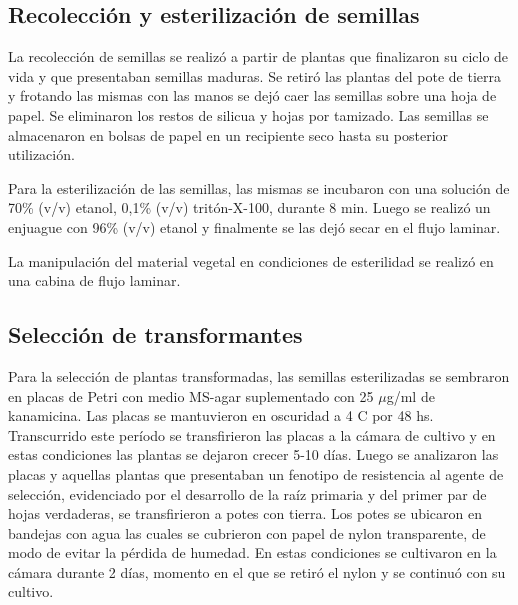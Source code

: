 \subsection{Recolección y esterilización de semillas}

La recolección de semillas se realizó a partir de plantas que finalizaron su ciclo de vida y que presentaban semillas maduras.
Se retiró las plantas del pote de tierra y frotando las mismas con las manos se dejó caer las semillas sobre una hoja de papel.
Se eliminaron los restos de silicua y hojas por tamizado. Las semillas se almacenaron en bolsas de papel en un recipiente seco hasta su posterior utilización.

Para la esterilización de las semillas, las mismas se incubaron con una solución de 70\% (v/v) etanol, 0,1\% (v/v) tritón-X-100, durante 8 min. 
Luego se realizó un enjuague con 96\% (v/v) etanol y finalmente se las dejó secar en el flujo laminar.

La manipulación del material vegetal en condiciones de esterilidad se realizó en una cabina de flujo laminar.

\subsection{Selección de transformantes}
Para la selección de plantas transformadas, las semillas esterilizadas se sembraron en placas de Petri con medio MS-agar suplementado con 25 $\mu$g/ml de kanamicina.
Las placas se mantuvieron en oscuridad a 4 \degree C por 48 hs. Transcurrido este período se transfirieron las placas a la cámara de cultivo y en estas condiciones las plantas se dejaron crecer 5-10 días.
Luego se analizaron las placas y aquellas plantas que presentaban un fenotipo de resistencia al agente de selección, evidenciado por el desarrollo de la raíz primaria y del primer par de hojas verdaderas, se transfirieron a potes con tierra.
Los potes se ubicaron en bandejas con agua las cuales se cubrieron con papel de nylon transparente, de modo de evitar la pérdida de humedad.
En estas condiciones se cultivaron en la cámara durante 2 días, momento en el que se retiró el nylon y se continuó con su cultivo.

